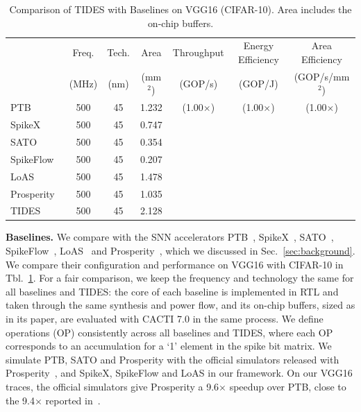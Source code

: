 \begin{table}[t]
  \centering
  \caption{Comparison of TIDES with Baselines on VGG16 (CIFAR-10). Area includes the on-chip buffers.}
  \label{tab:baselines}
  \small
  \begin{tabular}{@{}lcccccc@{}}
    \toprule
                 & Freq.  & Tech. & Area    & Throughput & Energy Efficiency & Area Efficiency \\
                 & (MHz)  & (nm)  & (mm$^2$) & (GOP/s)   & (GOP/J)           & (GOP/s/mm$^2$) \\
    \midrule
    PTB~\cite{lee2022ptb}              & 500 & 45 & 1.232 & \tbd{--} (1.00$\times$) & \tbd{--} (1.00$\times$) & \tbd{--} (1.00$\times$) \\
    SpikeX~\cite{xu2025spikex}         & 500 & 45 & 0.747 & \tbd{--} & \tbd{--} & \tbd{--} \\
    SATO~\cite{liu2022sato}            & 500 & 45 & 0.354 & \tbd{--} & \tbd{--} & \tbd{--} \\
    SpikeFlow~\cite{wang2025spikeflow} & 500 & 45 & 0.207 & \tbd{--} & \tbd{--} & \tbd{--} \\
    LoAS~\cite{yin2024loas}            & 500 & 45 & 1.478 & \tbd{--} & \tbd{--} & \tbd{--} \\
    Prosperity~\cite{prosperity2025}   & 500 & 45 & 1.035 & \tbd{--} & \tbd{--} & \tbd{--} \\
    TIDES                              & 500 & 45 & 2.128 & \tbd{--} & \tbd{--} & \tbd{--} \\
    \bottomrule
  \end{tabular}
\end{table}

\textbf{Baselines.} We compare with the SNN accelerators PTB~\cite{lee2022ptb},
SpikeX~\cite{xu2025spikex}, SATO~\cite{liu2022sato}, SpikeFlow~\cite{wang2025spikeflow},
LoAS~\cite{yin2024loas} and Prosperity~\cite{prosperity2025}, which we discussed in
Sec.~\ref{sec:background}. We compare their configuration and performance on VGG16 with CIFAR-10 in
Tbl.~\ref{tab:baselines}. For a fair comparison, we keep the frequency and technology the same for all
baselines and TIDES: the core of each baseline is implemented in RTL and taken through the same
synthesis and power flow, and its on-chip buffers, sized as in its paper, are evaluated with CACTI 7.0
in the same process. We define operations (OP) consistently across all baselines and TIDES, where each
OP corresponds to an accumulation for a `1' element in the spike bit matrix. We simulate PTB, SATO and
Prosperity with the official simulators released with Prosperity~\cite{prosperity2025}, and SpikeX,
SpikeFlow and LoAS in our framework. On our VGG16 traces, the official simulators give Prosperity a
9.6$\times$ speedup over PTB, close to the 9.4$\times$ reported in~\cite{prosperity2025}.
